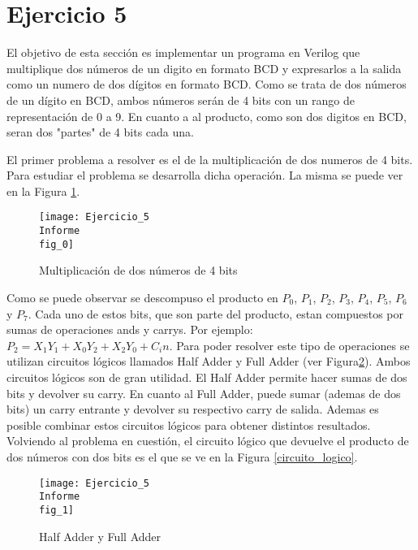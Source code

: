 \section{Ejercicio 5}


El objetivo de esta sección es implementar un programa en Verilog que multiplique dos números de un digito en formato BCD y expresarlos a la salida como un numero de dos dígitos en formato BCD. Como se trata
de dos números de un dígito en BCD, ambos números serán de 4 bits con un rango de representación de 0 a 9. En cuanto a al producto, como son dos digitos en BCD, seran dos "partes" de 4 bits cada una. 

El primer problema a resolver es el de la multiplicación de dos numeros de 4 bits. Para estudiar el problema se desarrolla dicha operación. La misma se puede ver en la Figura \ref{multiplicacion}. 


\begin{figure}[ht]                                                       
    \centering
    \texttt{[image: Ejercicio\_5\\Informe\\fig\_0]}
     \caption{Multiplicación de dos números de 4 bits}
     \label{multiplicacion}
     \end{figure}

Como se puede observar se descompuso el producto en $P_0$, $P_1$, $P_2$, $P_3$, $P_4$, $P_5$, $P_6$ y $P_7$. Cada uno de estos bits, que son parte del producto, estan compuestos por sumas de operaciones 
ands y carrys. Por ejemplo: $P_2 = X_1Y_1 + X_0Y_2 + X_2Y_0 + C_in$. Para poder resolver este tipo de operaciones se utilizan circuitos lógicos llamados Half Adder y Full Adder (ver Figura\ref{full_adder}). Ambos circuitos 
lógicos son de gran utilidad. El Half Adder permite hacer sumas de dos bits y devolver su carry. En cuanto al Full Adder, puede sumar (ademas de dos bits) un carry entrante y devolver su respectivo
carry de salida.  Ademas es posible combinar estos circuitos lógicos para obtener distintos resultados.
Volviendo al problema en cuestión, el circuito lógico que devuelve el producto de dos números con dos bits es el que se ve en la Figura \ref{circuito_logico}.


\begin{figure}[h!]                                                       
    \centering
    \texttt{[image: Ejercicio\_5\\Informe\\fig\_1]}
     \caption{Half Adder y Full Adder}
     \label{full_adder}
     \end{figure}




